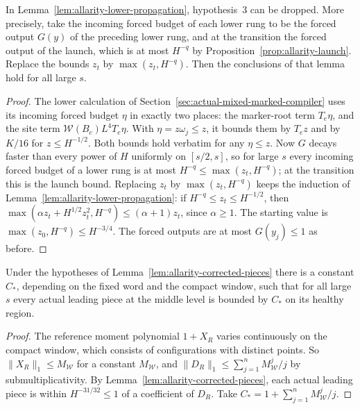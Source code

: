 \begin{lemma}
\label{lem:allarity-lower-forced}
In Lemma~\ref{lem:allarity-lower-propagation}, hypothesis~3 can be
dropped. More precisely, take the incoming forced budget of each lower
rung to be the forced output $G(y)$ of the preceding lower rung, and at
the transition the forced output of the launch, which is at most $H^{-q}$
by Proposition~\ref{prop:allarity-launch}. Replace the bounds $z_t$ by
$\max(z_t,H^{-q})$. Then the conclusions of that lemma hold for all large
$s$.
\end{lemma}
\begin{proof}
The lower calculation of Section~\ref{sec:actual-mixed-marked-compiler}
uses its incoming forced budget $\eta$ in exactly two places: the
marker-root term $T_e\eta$, and the site term
$\mathcal W(B_c)L^4T_e\eta$. With $\eta=z\omega_j\le z$, it bounds them by
$T_ez$ and by $K/16$ for $z\le H^{-1/2}$. Both bounds hold verbatim for
any $\eta\le z$. Now $G$ decays faster than every power of $H$ uniformly
on $[s/2,s]$, so for large $s$ every incoming forced budget of a lower
rung is at most $H^{-q}\le\max(z_t,H^{-q})$; at the transition this is
the launch bound. Replacing $z_t$ by $\max(z_t,H^{-q})$ keeps the
induction of Lemma~\ref{lem:allarity-lower-propagation}: if
$H^{-q}\le z_t\le H^{-1/2}$, then
$\max(\alpha z_t+H^{1/2}z_t^2,H^{-q})\le(\alpha+1)z_t$, since
$\alpha\ge1$. The starting value is $\max(z_0,H^{-q})\le H^{-3/4}$. The
forced outputs are at most $G(y_j)\le1$ as before.
\end{proof}

\begin{lemma}
\label{lem:allarity-amplitude}
Under the hypotheses of Lemma~\ref{lem:allarity-corrected-pieces} there is
a constant $C_*$, depending on the fixed word and the compact window,
such that for all large $s$ every actual leading piece at the middle level
is bounded by $C_*$ on its healthy region.
\end{lemma}
\begin{proof}
The reference moment polynomial $1+X_R$ varies continuously on the
compact window, which consists of configurations with distinct points.
So $\|X_R\|_1\le M_{\mathcal W}$ for a constant $M_{\mathcal W}$, and
$\|D_R\|_1\le\sum_{j=1}^n M_{\mathcal W}^j/j$ by submultiplicativity. By
Lemma~\ref{lem:allarity-corrected-pieces}, each actual leading piece is
within $H^{-31/32}\le1$ of a coefficient of $D_R$. Take
$C_*=1+\sum_{j=1}^nM_{\mathcal W}^j/j$.
\end{proof}

